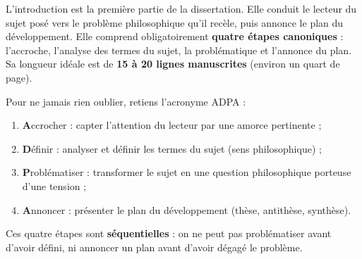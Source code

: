 \documentclass[11pt]{article}
\newcommand{\cle}[1]{{\popxbold\color{popdark}#1}}
\begin{document}
\begin{definition}
L'\cle{introduction} est la première partie de la dissertation. Elle conduit le lecteur du sujet posé vers le problème philosophique qu'il recèle, puis annonce le plan du développement. Elle comprend obligatoirement \textbf{quatre étapes canoniques} : l'accroche, l'analyse des termes du sujet, la problématique et l'annonce du plan. Sa longueur idéale est de \textbf{15 à 20 lignes manuscrites} (environ un quart de page).
\end{definition}

\begin{methode}
Pour ne jamais rien oublier, retiens l'acronyme \cle{ADPA} :
\begin{enumerate}
\item \textbf{A}ccrocher : capter l'attention du lecteur par une amorce pertinente ;
\item \textbf{D}éfinir : analyser et définir les termes du sujet (sens philosophique) ;
\item \textbf{P}roblématiser : transformer le sujet en une question philosophique porteuse d'une tension ;
\item \textbf{A}nnoncer : présenter le plan du développement (thèse, antithèse, synthèse).
\end{enumerate}
Ces quatre étapes sont \textbf{séquentielles} : on ne peut pas problématiser avant d'avoir défini, ni annoncer un plan avant d'avoir dégagé le problème.
\end{methode}
\end{document}
